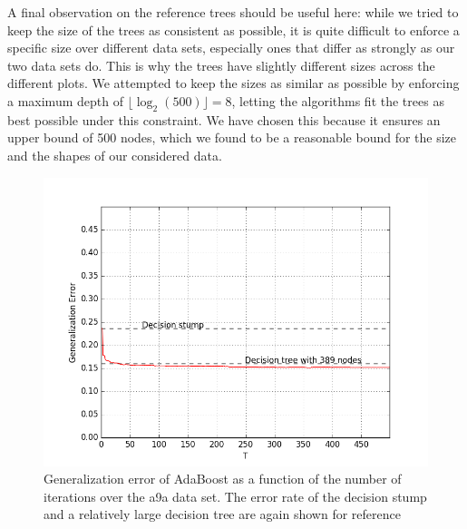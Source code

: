 \par A final observation on the reference trees should be useful here: while we tried to keep the size of the trees as consistent as possible, it is quite difficult to enforce a specific size over different data sets, especially ones that differ as strongly as our two data sets do. This is why the  trees have slightly different sizes across the different plots. We attempted to keep the sizes as similar as possible by enforcing a maximum depth of $\lfloor \log_2(500)\rfloor=8$, letting the algorithms fit the trees as best possible under this constraint. We have chosen this because it ensures an upper bound of 500 nodes, which we found to be a reasonable bound for the size and the shapes of our considered data.
\begin{figure}[!ht]
  \centering
      \includegraphics[width=\graphWidth]{generated/ADSVM.png}
  \caption{Generalization error of AdaBoost as a function of the number of iterations over the a9a data set. The error rate of the decision stump and a relatively large decision tree are again shown for reference}
      \label{fig:adaBSVM}
\end{figure}
\FloatBarrier

